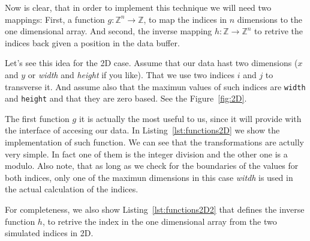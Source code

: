 Now is clear, that in order to implement this technique we will need two mappings:
First, a function $g:\mathbb{Z}^n \rightarrow \mathbb{Z}$, to map the indices in $n$ dimensions to the one dimensional array.
And second, the inverse mapping $h:\mathbb{Z} \rightarrow \mathbb{Z}^n$ to retrive the indices back given a position in the data buffer.

Let's see this idea for the 2D case.
Assume that our data hast two dimensions ($x$ and $y$ or \emph{width} and \emph{height} if you like).
That we use two indices $i$ and $j$ to transverse it.
And assume also that the maximun values of such indices are \texttt{width} and \texttt{height} and that they are zero based.
See the Figure~\ref{fig:2D}.

The first function $g$ it is actually the most useful to us, since it will provide with the interface of accesing our data. 
In Listing~\ref{lst:functions2D} we show the implementation of such function.
We can see that the transformations are actully very simple.
In fact one of them is the integer division and the other one is a modulo.
Also note, that as long as we check for the boundaries of the values for both indices, only one of the maximun dimensions in this case \emph{witdh} is used in the actual calculation of the indices.

{\centering
\begin{minipage}{\linewidth}
\end{minipage}
\par
}
\vspace{0.5cm}

For completeness, we also show Listing~\ref{lst:functions2D2} that defines the inverse function $h$, to retrive the index in the one dimensional array from the two simulated indices in 2D.

{\centering
\begin{minipage}{\linewidth}
\end{minipage}
\par
}
\vspace{0.5cm}

